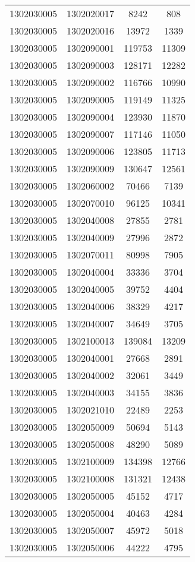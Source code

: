 \begin{longtable}{llcc}
1302030005 & 1302020017 & 8242 & 808\\
1302030005 & 1302020016 & 13972 & 1339\\
1302030005 & 1302090001 & 119753 & 11309\\
1302030005 & 1302090003 & 128171 & 12282\\
1302030005 & 1302090002 & 116766 & 10990\\
1302030005 & 1302090005 & 119149 & 11325\\
1302030005 & 1302090004 & 123930 & 11870\\
1302030005 & 1302090007 & 117146 & 11050\\
1302030005 & 1302090006 & 123805 & 11713\\
1302030005 & 1302090009 & 130647 & 12561\\
1302030005 & 1302060002 & 70466 & 7139\\
1302030005 & 1302070010 & 96125 & 10341\\
1302030005 & 1302040008 & 27855 & 2781\\
1302030005 & 1302040009 & 27996 & 2872\\
1302030005 & 1302070011 & 80998 & 7905\\
1302030005 & 1302040004 & 33336 & 3704\\
1302030005 & 1302040005 & 39752 & 4404\\
1302030005 & 1302040006 & 38329 & 4217\\
1302030005 & 1302040007 & 34649 & 3705\\
1302030005 & 1302100013 & 139084 & 13209\\
1302030005 & 1302040001 & 27668 & 2891\\
1302030005 & 1302040002 & 32061 & 3449\\
1302030005 & 1302040003 & 34155 & 3836\\
1302030005 & 1302021010 & 22489 & 2253\\
1302030005 & 1302050009 & 50694 & 5143\\
1302030005 & 1302050008 & 48290 & 5089\\
1302030005 & 1302100009 & 134398 & 12766\\
1302030005 & 1302100008 & 131321 & 12438\\
1302030005 & 1302050005 & 45152 & 4717\\
1302030005 & 1302050004 & 40463 & 4284\\
1302030005 & 1302050007 & 45972 & 5018\\
1302030005 & 1302050006 & 44222 & 4795\\

\end{longtable}

